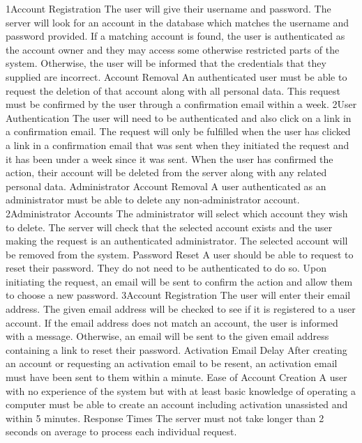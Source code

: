 			{1}{Account Registration}
			{The user will give their username and password.}
			{The server will look for an account in the database which matches
			the username and password provided.}
			{If a matching account is found, the user is authenticated as 
			the account owner and they may access some otherwise restricted 
			parts of the system. Otherwise, the user will be informed that the
			credentials that they supplied are incorrect.}
		\funcreq %
			{Account Removal}
			{An authenticated user must be able to request the deletion of 
			that account along with all personal data. This request must be 
			confirmed by the user through a confirmation email within a week.}
			{2}{User Authentication}
			{The user will need to be authenticated and also click on a link 
			in a confirmation email.}
			{The request will only be fulfilled when the user has clicked a 
			link in a confirmation email that was sent when they initiated the 
			request and it has been under a week since it was sent.}
			{When the user has confirmed the action, their account will be 
			deleted from the server along with any related personal data.}
		\funcreq %
			{Administrator Account Removal}
			{A user authenticated as an administrator must be able to delete
			any non-administrator account.}
			{2}{Administrator Accounts}
			{The administrator will select which account they wish to delete.}
			{The server will check that the selected account exists and the
			user making the request is an authenticated administrator.}
			{The selected account will be removed from the system.}
		\funcreq %
			{Password Reset}
			{A user should be able to request to reset their password. They do
			not need to be authenticated to do so. Upon initiating the request,
			an email will be sent to confirm the action and allow them to 
			choose a new password.}
			{3}{Account Registration}
			{The user will enter their email address.}
			{The given email address will be checked to see if it is 
			registered to a user account.}
			{If the email address does not match an account, the user is
			informed with a message. Otherwise, an email will be sent to the
			given email address containing a link to reset their password.}
		\nonfuncreq %
			{Activation Email Delay}
			{After creating an account or requesting an activation email to be
			resent, an activation email must have been sent to them within a
			minute.}
		\nonfuncreq %
			{Ease of Account Creation}
			{A user with no experience of the system but with at least basic
			knowledge of operating a computer must be able to create an account
			including activation unassisted and within 5 minutes.}
		\nonfuncreq %
			{Response Times}
			{The server must not take longer than 2 seconds on average to
			process each individual request.}
